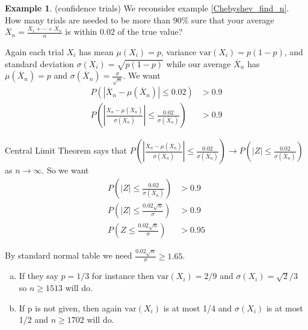 \documentclass[12pt]{amsart}
\theoremstyle{definition}
\newtheorem{example}[theorem]{Example}
\begin{document}
\begin{example} (confidence trials) We reconsider example \ref{Chebyshev_find_n}. How many trials are needed to be more than $90\%$ sure that your average $\overline{X}_n = \frac{X_1 + \cdots + X_n}{n}$ is within 0.02 of the true value?

Again each trial $X_i$ has mean $\mu(X_i) = p$, variance $\text{var}(X_i) = p(1 - p)$, and standard deviation $\sigma(X_i) = \sqrt{p(1 - p)}$ while our average $\overline{X}_n$ has $\mu(\overline{X}_n) = p$ and $\sigma(\overline{X}_n) = \frac{\sigma}{\sqrt n}$. We want
\begin{align*}
P(|\overline{X}_n-\mu(\overline{X}_n)|\leq 0.02) & > 0.9 \\
P \left( \left| \frac{\overline{X}_n-\mu(\overline{X}_n)}{\sigma(\overline{X}_n)} \right|\leq \frac{0.02}{\sigma(\overline{X}_n)} \right) & > 0.9
\end{align*}

Central Limit Theorem says that $P \left( \left| \frac{\overline{X}_n-\mu(\overline{X}_n)}{\sigma(\overline{X}_n)} \right|\leq \frac{0.02}{\sigma(\overline{X}_n)} \right) \to P\left( |Z| \leq \frac{0.02}{\sigma(\overline{X}_n)} \right)$ as $n \to \infty$. So we want
\begin{align*}
P\left( |Z| \leq \frac{0.02}{\sigma(\overline{X}_n)} \right) & >
0.9 \\
P \left( |Z| \leq \frac{0.02\sqrt n}{\sigma} \right) & >
0.9 \\
P \left( Z \leq \frac{0.02\sqrt{n}}{\sigma} \right) & > 0.95
\end{align*}

By standard normal table we need $\frac{0.02\sqrt{n}}{\sigma} \geq 1.65$.
\begin{enumerate}[a.]
\item If they say $p=1/3$ for instance then $\text{var}(X_i) = 2/9$ and $\sigma(X_i) = \sqrt{2}/3$ so $n \geq 1513$  will do.

\item If p is not given, then again $\text{var}(X_i)$ is at most 1/4 and $\sigma(X_i)$ is at most 1/2 and $n \geq 1702$ will do.
\end{enumerate}
\end{example}
\end{document}
